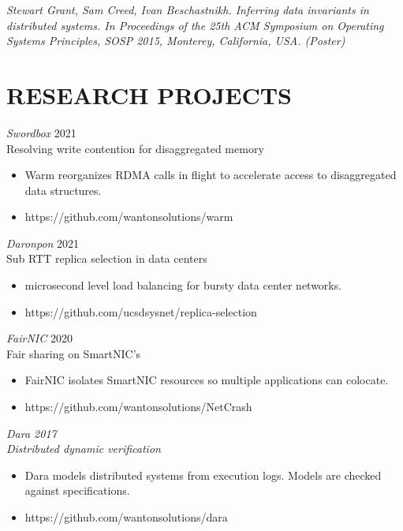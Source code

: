 \documentclass[line,margin]{res}
\begin{document}
\begin{resume}
{\sl Stewart Grant, Sam Creed, Ivan Beschastnikh. Inferring data
    invariants in distributed systems. In \it{Proceedings of the 25th
    ACM Symposium on Operating Systems Principles, SOSP 2015},
    Monterey, California, USA. (Poster)}


\section{RESEARCH PROJECTS}

{\sl Swordbox} \hfill 2021\\
    Resolving write contention for disaggregated memory
\begin{itemize} \itemsep -2pt
        \item Warm reorganizes RDMA calls in flight to accelerate access to disaggregated data structures.
        \item https://github.com/wantonsolutions/warm
\end{itemize}

{\sl Daronpon} \hfill 2021\\
    Sub RTT replica selection in data centers
\begin{itemize} \itemsep -2pt
        \item microsecond level load balancing for bursty data center networks.
        \item https://github.com/ucsdsysnet/replica-selection
\end{itemize}

{\sl FairNIC } \hfill 2020\\
    Fair sharing on SmartNIC's
\begin{itemize} \itemsep -2pt
        \item FairNIC isolates SmartNIC resources so multiple applications can colocate.
        \item https://github.com/wantonsolutions/NetCrash
\end{itemize}

{\sl Dara \hfill 2017\\
    Distributed dynamic verification
\begin{itemize} \itemsep -2pt
        \item Dara models distributed systems from execution logs. Models are checked against specifications.
        \item https://github.com/wantonsolutions/dara
\end{itemize}

}
\end{resume}
\end{document}
